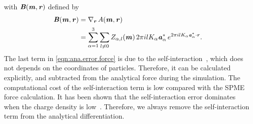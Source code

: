 \documentclass[journal=jacsat,manuscript=article]{achemso}
\newcommand{\redc}[1]{{\color{black} #1}}
\renewcommand{\v}[1]{\textbf{\textit{#1}}}
\begin{document}
with $\v B(\v m, \v r)$ defined by
\begin{align}\nonumber
  \v B(\v m, \v r)
  &=
  \nabla_{\v r}\,A(\v m, \v r)\\\label{eqn:error-B}
  &=
  \sum_{\alpha=1}^3\sum_{l\neq 0}
  Z_{\alpha,l}(\v m)\,
  2\pi i l K_\alpha\v a_\alpha^\ast\,e^{2\pi i l K_\alpha\v a^\ast_\alpha\cdot \v r}.
\end{align}
The last term in \ref{eqn:ana.error.force} is due to the
self-interaction~\cite{cerutti2009staggered, ballenegger2011removal,
  neelov2010interlaced}, which does not depends on the coordinates of
particles. Therefore, it can be calculated explicitly, and subtracted
from the analytical force during the simulation. The computational cost of
the self-interaction term is low \redc{compared} with the SPME
force calculation. It \redc{has been} shown that the self-interaction  error
\redc{dominates} when the charge density is low~\cite{cerutti2009staggered}.
Therefore, we always remove the self-interaction term from
the analytical differentiation.
\end{document}
